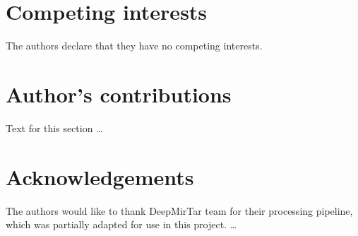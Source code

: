 \documentclass{bmcart}
\begin{document}
\begin{backmatter}

\section*{Competing interests}
  The authors declare that they have no competing interests.

\section*{Author's contributions}
    Text for this section \ldots

\section*{Acknowledgements}
  The authors would like to thank DeepMirTar team for their processing pipeline, which was partially adapted for use in this project.
 \ldots





\end{backmatter}
\end{document}
